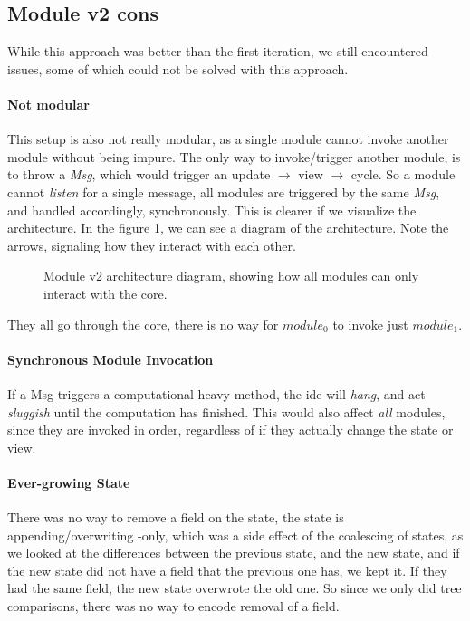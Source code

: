 \subsection{Module v2 cons}

While this approach was better than the first iteration, we still encountered
issues, some of which could not be solved with this approach.

\paragraph{Not modular} This setup is also not really modular, as a single
module cannot invoke another module without being impure. The only way to
invoke/trigger another module, is to throw a \textit{Msg}, which would trigger
an update $\to$ view $\to$ cycle. So a module cannot \textit{listen} for a single
message, all modules are triggered by the same \textit{Msg}, and handled
accordingly, synchronously. This is clearer if we visualize the architecture. In
the figure \ref{fig:modulev2}, we can see a diagram of the architecture. Note
the arrows, signaling how they interact with each other.

\begin{figure}[H]
  \centering
  
  \caption{
    Module v2 architecture diagram, showing how all modules can only interact
    with the core.
  }
  \label{fig:modulev2}
\end{figure}

They all go through the core, there is no way for $module_0$ to invoke just
$module_1$.

\paragraph{Synchronous Module Invocation} If a Msg triggers a computational
heavy method, the \gls*{ide} will \textit{hang}, and act \textit{sluggish} until
the computation has finished. This would also affect \textit{all} modules,
since they are invoked in order, regardless of if they actually change the
state or view.

\paragraph{Ever-growing State} There was no way to remove a field on the state,
the state is appending/overwriting -only, which was a side effect of the
coalescing of states, as we looked at the differences between the previous
state, and the new state, and if the new state did not have a field that the
previous one has, we kept it. If they had the same field, the new state
overwrote the old one. So since we only did tree comparisons, there was no way
to encode removal of a field.


